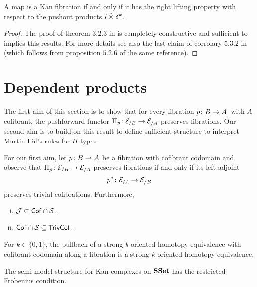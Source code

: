 \documentclass[reqno,10pt,a4paper,oneside,draft]{amsart}
\begin{document}
\begin{proposition} A map is a Kan fibration if and only if it has the right lifting property with respect to the pushout products $i \mathbin{\hat{\times}} \delta^k$.
\end{proposition} 

\begin{proof}The proof of theorem $3.2.3$ in \cite{joyal-tierney:simplicial-homotopy-theory} is completely constructive and sufficient to implies this results.
For more details see also the last claim of corrolary $5.3.2$ in \cite{henry2018wms} (which follows from proposition $5.2.6$ of the same reference). 
\end{proof}

\newpage

\section{Dependent products}

The first aim of this section is to show that for every fibration $p \colon B \to A$~with $A$ cofibrant, the pushforward functor $\Pi_p \colon \mathcal{E}_{/B} \to \mathcal{E}_{/A}$ 
preserves fibrations. Our second aim is to build on this result to define sufficient structure to interpret Martin-L\"of's rules for $\Pi$-types. 

\medskip

For our first aim, let $p \colon B \to A$ be a fibration with cofibrant codomain and observe that 
$\Pi_p \colon \mathcal{E}_{/B} \to \mathcal{E}_{/A}$  preserves fibrations if and only if its left adjoint 
\[
p^* \colon \mathcal{E}_{/A} \to \mathcal{E}_{/B}
\]
preserves trivial cofibrations. Furthermore,
\begin{lemma} \label{thm:missing-1}
\hfill 
\begin{enumerate}[(i)] 
\item $\mathcal{J} \subset \mathsf{Cof} \cap \mathcal{S}$.
\item $\mathsf{Cof} \cap \mathcal{S} \subseteq \mathsf{TrivCof}$.
\end{enumerate}
\end{lemma} 

\begin{lemma} 
\label{thm:missing-2}
For $k \in \{0,1\}$, the pullback of a strong $k$-oriented homotopy equivalence 
with cofibrant codomain along a
fibration is a strong $k$-oriented homotopy equivalence.
\end{lemma}






\begin{theorem} 
\label{thm:restricted-frobenius}
The semi-model structure for Kan complexes on $\mathbf{SSet}$ has the restricted Frobenius condition.
\end{theorem} 
\end{document}
